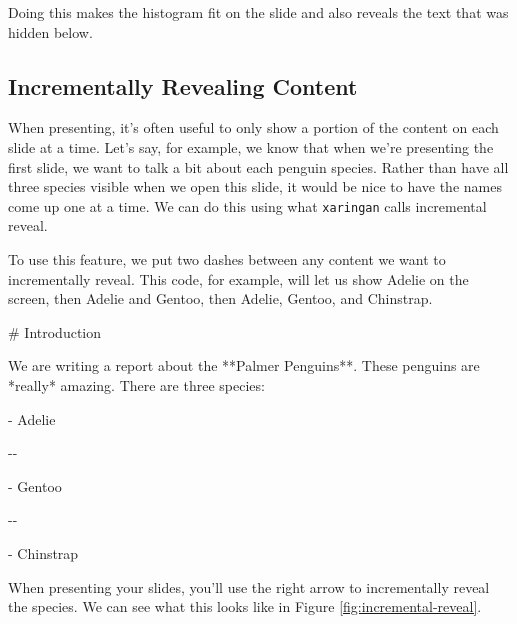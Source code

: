 \documentclass[
]{book}
\newenvironment{Shaded}{\begin{snugshade}}{\end{snugshade}}
\newcommand{\FunctionTok}[1]{\textcolor[rgb]{0.00,0.00,0.00}{#1}}
\newcommand{\NormalTok}[1]{#1}
\newcommand{\SpecialStringTok}[1]{\textcolor[rgb]{0.31,0.60,0.02}{#1}}
\begin{document}
Doing this makes the histogram fit on the slide and also reveals the text that was hidden below.

\hypertarget{incrementally-revealing-content}{%
\subsection*{Incrementally Revealing Content}\label{incrementally-revealing-content}}

When presenting, it's often useful to only show a portion of the content on each slide at a time. Let's say, for example, we know that when we're presenting the first slide, we want to talk a bit about each penguin species. Rather than have all three species visible when we open this slide, it would be nice to have the names come up one at a time. We can do this using what \texttt{xaringan} calls incremental reveal.

To use this feature, we put two dashes between any content we want to incrementally reveal. This code, for example, will let us show Adelie on the screen, then Adelie and Gentoo, then Adelie, Gentoo, and Chinstrap.

\begin{Shaded}
\begin{Highlighting}[]
\FunctionTok{\# Introduction}

\NormalTok{We are writing a report about the **Palmer Penguins**. These penguins are *really* amazing. There are three species:}

\SpecialStringTok{{-} }\NormalTok{Adelie}

\NormalTok{{-}{-}}

\SpecialStringTok{{-} }\NormalTok{Gentoo}

\NormalTok{{-}{-}}

\SpecialStringTok{{-} }\NormalTok{Chinstrap}
\end{Highlighting}
\end{Shaded}

When presenting your slides, you'll use the right arrow to incrementally reveal the species. We can see what this looks like in Figure \ref{fig:incremental-reveal}.
\end{document}

